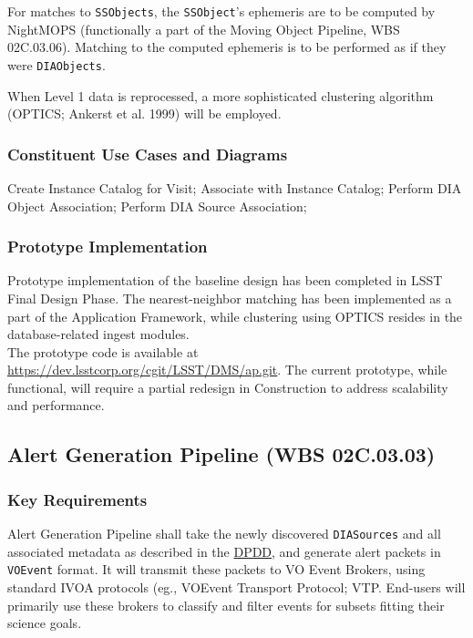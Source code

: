 \documentclass[12pt]{article}
\newcommand{\code}[1]{\texttt{#1}}
\newcommand{\DIASources}{\code{DIASources}\xspace}
\newcommand{\DIAObjects}{\code{DIAObjects}\xspace}
\newcommand{\SSObject}{\code{SSObject}\xspace}
\newcommand{\SSObjects}{\code{SSObjects}\xspace}
\newcommand{\VOEvent}{\code{VOEvent}\xspace}
\newcommand{\ds}[2]{{\color{blue} \href{https://docushare.lsstcorp.org/docushare/dsweb/Get/#1}{#2}}\xspace}
\newcommand{\DPDD}{\ds{LSE-163}{DPDD}}
\newcommand{\wbsAP}{WBS 02C.03.03}
\newcommand{\wbsMOPS}{WBS 02C.03.06}
\begin{document}
For matches to \SSObjects, the \SSObject's ephemeris are to be computed by NightMOPS (functionally a part of the Moving Object Pipeline, \wbsMOPS). Matching to the computed ephemeris is to be performed as if they were \DIAObjects.

When Level 1 data is reprocessed, a more sophisticated clustering algorithm (OPTICS; Ankerst et al. 1999) will be employed.

\subsubsection{Constituent Use Cases and Diagrams}

Create Instance Catalog for Visit;
Associate with Instance Catalog;
Perform DIA Object Association;
Perform DIA Source Association;

\subsubsection{Prototype Implementation}

Prototype implementation of the baseline design has been completed in LSST Final Design Phase. The nearest-neighbor matching has been implemented as a part of the Application Framework, while clustering using OPTICS resides in the database-related ingest modules.
\\

The prototype code is available at \url{https://dev.lsstcorp.org/cgit/LSST/DMS/ap.git}. The current prototype, while functional, will require a partial redesign in Construction to address scalability and performance.

\clearpage

\subsection{Alert Generation Pipeline (\wbsAP)}

\subsubsection{Key Requirements}

Alert Generation Pipeline shall take the newly discovered \DIASources and all associated metadata as described in the \DPDD, and generate alert packets in \VOEvent format. It will transmit these packets to VO Event Brokers, using standard IVOA protocols (eg., VOEvent Transport Protocol; VTP. End-users will primarily use these brokers to classify and filter events for subsets fitting their science goals.
\end{document}
